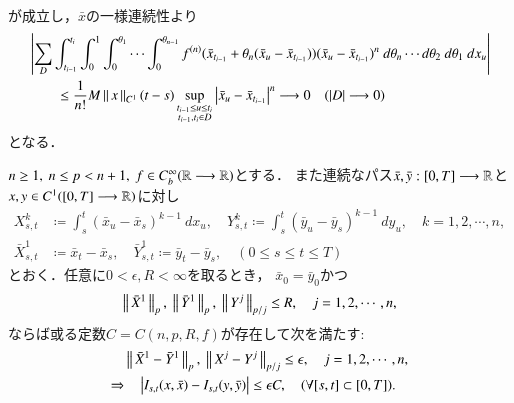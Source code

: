 \begin{prf}
\begin{align}
		\end{align}
		が成立し，$\bar{x}$の一様連続性より
		\begin{align}
			&\left| \sum_D \int_{t_{i-1}}^{t_i} \int_0^1 \int_0^{\theta_1} \cdots \int_0^{\theta_{n-1}} f^{(n)}(\bar{x}_{t_{i-1}} + \theta_n(\bar{x}_u - \bar{x}_{t_{i-1}}))(\bar{x}_u - \bar{x}_{t_{i-1}})^n\ d\theta_n\cdots d\theta_2\ d\theta_1\ dx_u \right| \\
			&\qquad \leq \frac{1}{n!} M \left\|\, x\, \right\|_{C^1} (t-s) \operatorname*{sup}_{\substack{t_{i-1} \leq u \leq t_i \\ t_{i-1},t_i \in D}} \left| \bar{x}_u - \bar{x}_{t_{i-1}} \right|^n
			\longrightarrow 0
			\quad (|D| \longrightarrow 0)
		\end{align}
		となる．
		\QED
	\end{prf}
	
	\begin{screen}
		\begin{thm}[連続性定理]
			$n \geq 1,\ n \leq p < n+1,\ f \in C^\infty_b(\mathbb{R} \longrightarrow \mathbb{R})$\footnotemark とする．
			また連続なパス$\bar{x},\bar{y}:[0,T] \longrightarrow \mathbb{R}$と
			$x,y \in C^1([0,T] \longrightarrow \mathbb{R})$に対し
			\begin{align}
				X^k_{s,t} &\coloneqq \int_s^t (\bar{x}_u - \bar{x}_s)^{k-1}\ dx_u,
				\quad Y^k_{s,t} \coloneqq \int_s^t (\bar{y}_u - \bar{y}_s)^{k-1}\ dy_u,
				\quad k=1,2,\cdots,n, \\
				\bar{X}^1_{s,t} &\coloneqq \bar{x}_t - \bar{x}_s,
				\quad \bar{Y}^1_{s,t} \coloneqq \bar{y}_t - \bar{y}_s,
				\quad (0 \leq s \leq t \leq T)
			\end{align}
			とおく．任意に$0 < \epsilon, R < \infty$を取るとき，
			$\bar{x}_0 = \bar{y}_0$かつ
			\begin{align}
				\Norm{\bar{X}^1}{p},\ \Norm{\bar{Y}^1}{p},\ \Norm{Y^j}{p/j} \leq R,
				\quad j=1,2,\cdots,n,
			\end{align}
			ならば或る定数$C = C(n,p,R,f)$が存在して次を満たす:
			\begin{align}
				&\left\|\, \bar{X}^1 - \bar{Y}^1\, \right\|_{p},\ \left\|\, X^j - Y^j\, \right\|_{p/j} \leq \epsilon,
				\quad j=1,2,\cdots,n, \\
				\Rightarrow&\quad \left| I_{s,t}(x,\bar{x}) - I_{s,t}(y,\bar{y}) \right| \leq \epsilon C,
				\quad (\forall [s,t] \subset [0,T]).
			\end{align}
		\end{thm}
	\end{screen}
